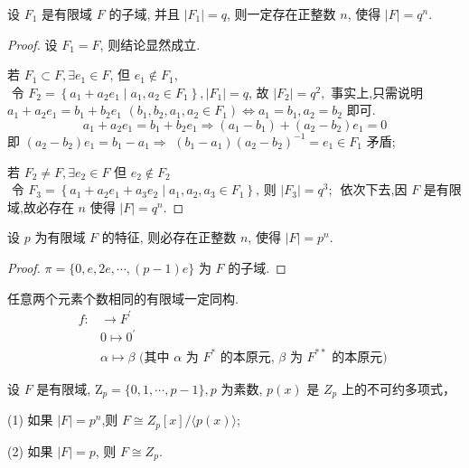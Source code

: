 \begin{theorem}
    设 $ F_{1} $ 是有限域 $ F $ 的子域, 并且 $ \left|F_{1}\right|=q $, 则一定存在正整数 $ n $, 使得 $ |F|=q^{n} $.
\end{theorem}
\begin{proof}
设 $ F_{1}=F $, 则结论显然成立.

若 $ F_{1} \subset F, \exists e_{1} \in F $, 但 $ e_{1} \notin F_{1} $,$\text { 令 } F_{2}=\left\{a_{1}+a_{2} e_{1} \mid a_{1}, a_{2} \in F_{1}\right\},\left|F_{1}\right|=q \text {, 故 }\left|F_{2}\right|=q^{2} ,$
事实上,只需说明 $ a_{1}+a_{2} e_{1}=b_{1}+b_{2} e_{1} $
$\left(b_{1}, b_{2}, a_{1}, a_{2} \in F_{1}\right)\Leftrightarrow a_{1}=b_{1}, a_{2}=b_{2} \text { 即可. }$
$$
a_{1}+a_{2} e_{1}=b_{1}+b_{2} e_{1} \Rightarrow\left(a_{1}-b_{1}\right)+\left(a_{2}-b_{2}\right) e_{1}=0
$$
即 $ \left(a_{2}-b_{2}\right) e_{1}=b_{1}-a_{1} \Rightarrow $
$ \left(b_{1}-a_{1}\right)\left(a_{2}-b_{2}\right)^{-1}=e_{1} \in F_{1} $ 矛盾;

若 $ F_{2} \neq F, \exists e_{2} \in F $ 但 $ e_{2} \notin F_{2} $
$\text { 令 } F_{3}=\left\{a_{1}+a_{2} e_{1}+a_{3} e_{2} \mid a_{1}, a_{2}, a_{3} \in F_{1}\right\} \text {, 则 }\left|F_{3}\right|=q^{3} \text {; }$
依次下去,因 $ F $ 是有限域,故必存在 $ n $ 使得 $ |F|=q^{n} $.
\end{proof}

\begin{corollary}
    设 $ p $ 为有限域 $ F $ 的特征, 则必存在正整数 $ n $, 使得 $ |F|=p^{n} $.
\end{corollary}
\begin{proof}
     $ \pi=\{0, e, 2 e, \cdots,(p-1) e\} $ 为 $ F $ 的子域.
\end{proof}

\begin{theorem}
    任意两个元素个数相同的有限域一定同构.
    $$
\begin{aligned}
f: & \rightarrow F^{\prime} \\
& 0 \mapsto 0^{\prime} \\
& \alpha \mapsto \beta \text { (其中 } \alpha \text { 为 } F^{*} \text { 的本原元, } \beta \text { 为 } F^{* *} \text { 的本原元) }
\end{aligned}
$$
\end{theorem}

\begin{corollary}
     设 $ F $ 是有限域, $ \mathrm{Z}_{p}=\{0,1, \cdots, p-1\}, p $ 为素数, $ p(x) $ 是 $ Z_{p} $ 上的不可约多项式，
     
(1) 如果 $ |F|=p^{n} $,则 $ F \cong Z_{p}[x] /\langle p(x)\rangle $;

(2) 如果 $ |F|=p $, 则 $ F \cong Z_{p} $.
\end{corollary}

